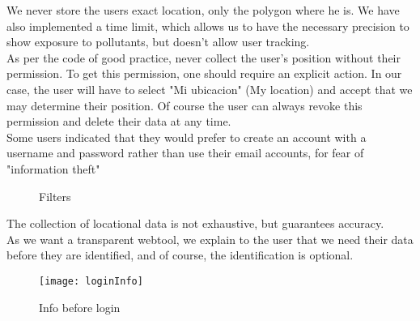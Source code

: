 We never store the users exact location, only the polygon where he is.
We have also implemented a time limit, which allows us to have the necessary precision to show exposure to pollutants, but doesn't allow user tracking.\\

As per the code of good practice, never collect the user's position without their permission.
To get this permission, one should require an explicit action. In our case, the user will have to select "Mi ubicacion" (My location) and accept 
that we may determine their position. Of course the user can always revoke this permission and
delete their data at any time. \\

Some users indicated that they would prefer to create an account with a username and password
rather than use their email accounts, for fear of "information theft"

\begin{figure}[ht]
    \centering
    \hfill
    \caption{Filters}
\end{figure}

The collection of locational data is not exhaustive, but guarantees accuracy. \\

As we want a transparent webtool, we explain to the user that we need their data before
they are identified, and of course, the identification is optional. \\

\begin{figure}[ht]
    \centering
    \texttt{[image: loginInfo]}
    \caption{Info before login}
\end{figure}